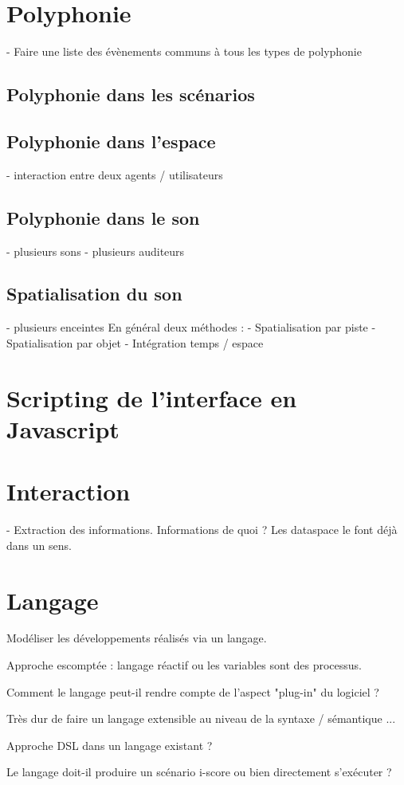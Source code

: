 \documentclass[french,a4paper,openany,12pt]{book}
\begin{document}
\section{Polyphonie}
- Faire une liste des évènements communs à tous les types de polyphonie
\subsection{Polyphonie dans les scénarios}
\subsection{Polyphonie dans l'espace}
- interaction entre deux agents / utilisateurs

\subsection{Polyphonie dans le son}
- plusieurs sons
- plusieurs auditeurs
\subsection{Spatialisation du son}
- plusieurs enceintes
En général deux méthodes :
- Spatialisation par piste
- Spatialisation par objet
- Intégration temps / espace
\section{Scripting de l'interface en Javascript}

\section{Interaction}
- Extraction des informations.
Informations de quoi ? Les dataspace le font déjà dans un sens.

\section{Langage}
Modéliser les développements réalisés via un langage.

Approche escomptée : langage réactif ou les variables sont des processus.

Comment le langage peut-il rendre compte de l'aspect "plug-in" du logiciel ? 

Très dur de faire un langage extensible au niveau de la syntaxe / sémantique ...

Approche DSL dans un langage existant ?

Le langage doit-il produire un scénario i-score ou bien directement s'exécuter ? 
\end{document}
